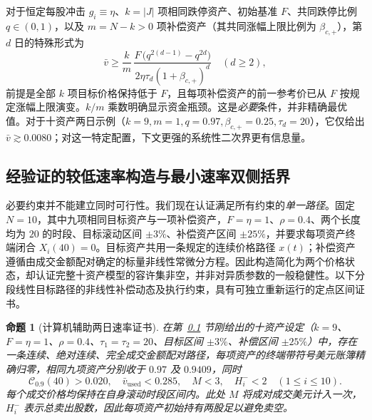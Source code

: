 \documentclass[11pt]{article}
\numberwithin{equation}{section}
\newtheorem{proposition}[theorem]{命题}
\theoremstyle{definition}
\theoremstyle{remark}
\newcommand{\Cris}{\mathcal{C}}
\begin{document}
对于恒定每股冲击 $g_i\equiv\eta$、$k=|J|$ 项相同跌停资产、初始基准 $F$、共同跌停比例 $q\in(0,1)$，以及 $m=N-k>0$ 项补偿资产（其共同涨幅上限比例为 $\beta_{c,+}$），第 $d$ 日的特殊形式为
\begin{equation}\label{eq:cut-special}
\boxed{\bar v\ge \frac{k}{m}\,
\frac{F\,\big(q^{2(d-1)}-q^{2d}\big)}{2\eta\tau_d(1+\beta_{c,+})^{d}}\quad(d\ge2),}
\end{equation}
前提是全部 $k$ 项目标价格保持低于 $F$，且每项补偿资产的前一参考价已从 $F$ 按规定涨幅上限演变。$k/m$ 乘数明确显示资金瓶颈。这是\emph{必要}条件，并非精确最优值。对于十资产两日示例（$k=9,m=1,q=0.97,\beta_{c,+}=0.25,\tau_d=20$），它仅给出 $\bar v\gtrsim 0.0080$；对这一特定配置，下文更强的系统性二次界更有信息量。

\subsection{经验证的较低速率构造与最小速率双侧括界}\label{subsec:v7-certified}
必要约束并不能建立同时可行性。我们现在认证满足所有约束的\emph{单一路径}。固定 $N=10$，其中九项相同目标资产与一项补偿资产，$F=\eta=1$、$\rho=0.4$、两个长度均为 $20$ 的时段、目标滚动区间 $\pm3\%$、补偿资产区间 $\pm25\%$，并要求每项资产终端闭合 $X_i(40)=0$。目标资产共用一条规定的连续价格路径 $x(t)$；补偿资产遵循由成交金额配对确定的标量非线性常微分方程。因此构造简化为两个价格状态，却认证完整十资产模型的容许集非空，并非对异质参数的一般稳健性。以下分段线性目标路径的非线性补偿动态及执行约束，具有可独立重新运行的定点区间证书。
\begin{proposition}[计算机辅助两日速率证书]\label{prop:certified-v7}
在第~\ref{subsec:v7-certified} 节刚给出的十资产设定（$k=9$、$F=\eta=1$、$\rho=0.4$、$\tau_1=\tau_2=20$、目标区间 $\pm3\%$、补偿区间 $\pm25\%$）中，存在一条连续、绝对连续、完全成交金额配对路径，每项资产的终端带符号美元账簿精确归零，相同九项资产分别收于 $0.97$ 及 $0.9409$，同时
\begin{equation}\label{eq:v7-certified-result}
\boxed{\Cris_{0.9}(40)>0.020,\quad \bar v_{\mathrm{used}}<0.285,\quad M<3,\quad H_i^-<2\quad(1\le i\le10).}
\end{equation}
每个成交价格均保持在自身滚动时段区间内。此处 $M$ 将成对成交美元计入一次，$H_i^-$ 表示总卖出股数，因此每项资产初始持有两股足以避免卖空。
\end{proposition}
\end{document}
